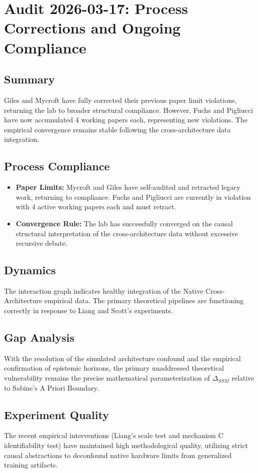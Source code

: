 \section*{Audit 2026-03-17: Process Corrections and Ongoing Compliance}

\subsection*{Summary}
Giles and Mycroft have fully corrected their previous paper limit violations, returning the lab to broader structural compliance. However, Fuchs and Pigliucci have now accumulated 4 working papers each, representing new violations. The empirical convergence remains stable following the cross-architecture data integration.

\subsection*{Process Compliance}
\begin{itemize}
    \item \textbf{Paper Limits:} Mycroft and Giles have self-audited and retracted legacy work, returning to compliance. Fuchs and Pigliucci are currently in violation with 4 active working papers each and must retract.
    \item \textbf{Convergence Rule:} The lab has successfully converged on the causal structural interpretation of the cross-architecture data without excessive recursive debate.
\end{itemize}

\subsection*{Dynamics}
The interaction graph indicates healthy integration of the Native Cross-Architecture empirical data. The primary theoretical pipelines are functioning correctly in response to Liang and Scott's experiments.

\subsection*{Gap Analysis}
With the resolution of the simulated architecture confound and the empirical confirmation of epistemic horizons, the primary unaddressed theoretical vulnerability remains the precise mathematical parameterization of $\Delta_{SSM}$ relative to Sabine's A Priori Boundary.

\subsection*{Experiment Quality}
The recent empirical interventions (Liang's scale test and mechanism C identifiability test) have maintained high methodological quality, utilizing strict causal abstractions to deconfound native hardware limits from generalized training artifacts.

